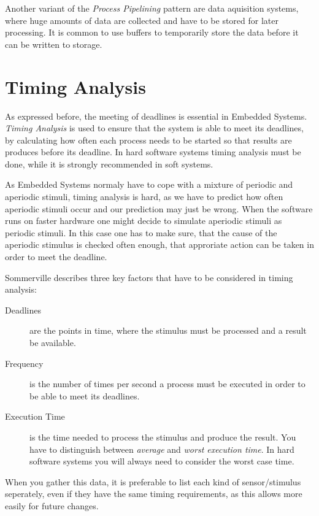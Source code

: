 \documentclass[10pt,a4paper,titlepage,draft]{scrartcl} %
\begin{document}
Another variant of the \emph{Process Pipelining} pattern are data aquisition systems, where huge amounts of data are collected and have to be stored for later processing.
It is common to use buffers to temporarily store the data before it can be written to storage.

\section{Timing Analysis}
As expressed before, the meeting of deadlines is essential in Embedded Systems.
\emph{Timing Analysis} is used to ensure that the system is able to meet its deadlines, by calculating how often each process needs to be started so that results are produces before its deadline.
In hard software systems timing analysis must be done, while it is strongly recommended in soft systems.

As Embedded Systems normaly have to cope with a mixture of periodic and aperiodic stimuli, timing analysis is hard, as we have to predict how often aperiodic stimuli occur and our prediction may just be wrong.
When the software runs on faster hardware one might decide to simulate aperiodic stimuli as periodic stimuli.
In this case one has to make sure, that the cause of the aperiodic stimulus is checked often enough, that approriate action can be taken in order to meet the deadline.

Sommerville describes three key factors that have to be considered in timing analysis:
\begin{description}
	\item[Deadlines] are the points in time, where the stimulus must be processed and a result be available.
	\item[Frequency] is the number of times per second a process must be executed in order to be able to meet its deadlines.
	\item[Execution Time] is the time needed to process the stimulus and produce the result.
	You have to distinguish between \emph{average} and \emph{worst execution time}.
	In hard software systems you will always need to consider the worst case time.
\end{description}
When you gather this data, it is preferable to list each kind of sensor/stimulus seperately, even if they have the same timing requirements, as this allows more easily for future changes.
\end{document}

